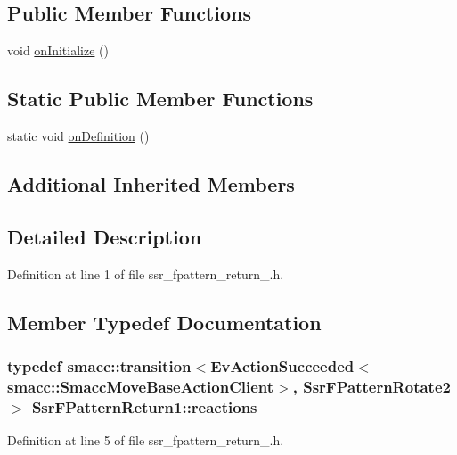 \subsection*{Public Member Functions}
\begin{DoxyCompactItemize}
\item 
void \hyperlink{structSsrFPatternReturn1_acce01589edd211023478e946a070851a}{on\+Initialize} ()
\end{DoxyCompactItemize}
\subsection*{Static Public Member Functions}
\begin{DoxyCompactItemize}
\item 
static void \hyperlink{structSsrFPatternReturn1_a33764ba1bba88bee311bcb7e62992405}{on\+Definition} ()
\end{DoxyCompactItemize}
\subsection*{Additional Inherited Members}


\subsection{Detailed Description}


Definition at line 1 of file ssr\+\_\+fpattern\+\_\+return\+\_.\+h.



\subsection{Member Typedef Documentation}
\subsubsection[{\texorpdfstring{reactions}{reactions}}]{\setlength{\rightskip}{0pt plus 5cm}typedef {\bf smacc\+::transition}$<$Ev\+Action\+Succeeded$<${\bf smacc\+::\+Smacc\+Move\+Base\+Action\+Client}$>$, {\bf Ssr\+F\+Pattern\+Rotate2}$>$ {\bf Ssr\+F\+Pattern\+Return1\+::reactions}}\hypertarget{structSsrFPatternReturn1_a8880356d06b1fa1aa432952cf3886702}{}\label{structSsrFPatternReturn1_a8880356d06b1fa1aa432952cf3886702}


Definition at line 5 of file ssr\+\_\+fpattern\+\_\+return\+\_.\+h.



